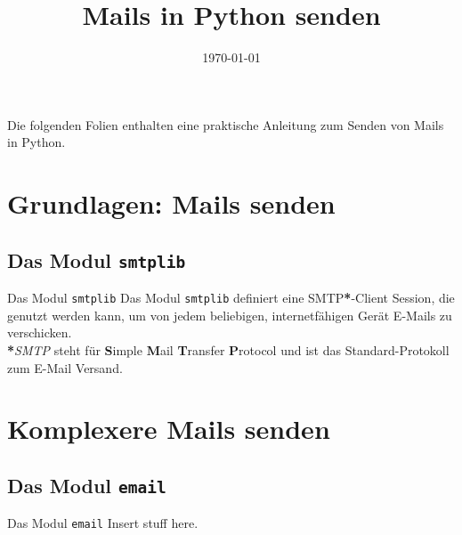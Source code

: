 


\newcommand{\topic}{
	Mails in Python senden
}

\title{\topic}
\supertitle{\course}
\date{\today}



\maketitle

\begin{frame}
	\tableofcontents
\end{frame}


\begin{frame}
	Die folgenden Folien enthalten eine praktische Anleitung zum Senden von Mails in Python.
\end{frame}


\section{Grundlagen: Mails senden}
\subsection{Das Modul \texttt{smtplib}}
\begin{frame}[fragile]{Das Modul \texttt{smtplib}}
	Das Modul \texttt{smtplib} definiert eine SMTP\textbf{*}-Client Session, die genutzt werden kann, um von jedem beliebigen, internetf\"ahigen Ger\"at E-Mails zu verschicken. \\[1cm]
	
	\textbf{*}\textit{SMTP} steht für \textbf{S}imple \textbf{M}ail \textbf{T}ransfer
	\textbf{P}rotocol und ist das Standard-Protokoll zum E-Mail Versand.
\end{frame}


\section{Komplexere Mails senden}
\subsection{Das Modul \texttt{email}}
\begin{frame}[fragile]{Das Modul \texttt{email}}
	Insert stuff here.
\end{frame}



